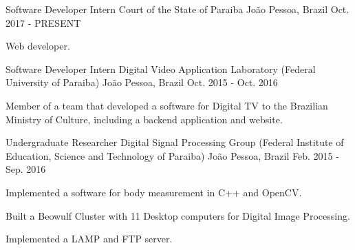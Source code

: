 

\begin{cventries}

  \cventry
    {Software Developer Intern} %
    {Court of the State of Paraiba} %
    {João Pessoa, Brazil} %
    {Oct. 2017 - PRESENT} %
    {
      \begin{cvitems} %
        \item {Web developer.}
      \end{cvitems}
    }
    
  \cventry
    {Software Developer Intern} %
    {Digital Video Application Laboratory (Federal University of Paraiba)} %
    {João Pessoa, Brazil} %
    {Oct. 2015 - Oct. 2016} %
    {
      \begin{cvitems} %
        \item {Member of a team that developed a software for Digital TV to the Brazilian Ministry of Culture, including a backend application and website.}
      \end{cvitems}
    }
    
  \cventry
    {Undergraduate Researcher} %
    {Digital Signal Processing Group (Federal Institute of Education, Science and Technology of Paraiba)} %
    {João Pessoa, Brazil} %
    {Feb. 2015 - Sep. 2016} %
    {
      \begin{cvitems} %
        \item {Implemented a software for body measurement in C++ and OpenCV.}
        \item {Built a Beowulf Cluster with 11 Desktop computers for Digital Image Processing.}
        \item {Implemented a LAMP and FTP server.}
      \end{cvitems}
    }


\end{cventries}
